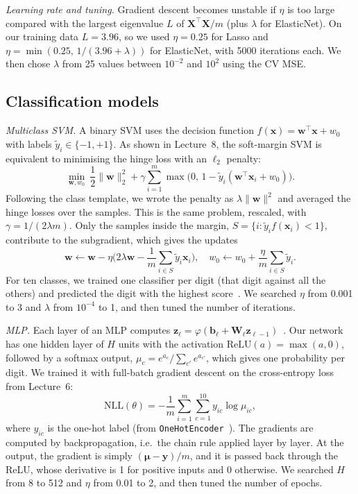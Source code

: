 \documentclass[conference]{IEEEtran}
\newcommand{\vect}[1]{\mathbf{#1}}
\begin{document}
\textit{Learning rate and tuning.} Gradient descent becomes unstable if $\eta$ is too large compared with the largest eigenvalue $L$ of $\vect{X}^\top\vect{X}/m$ (plus $\lambda$ for ElasticNet). On our training data $L=3.96$, so we used $\eta=0.25$ for Lasso and $\eta=\min(0.25,\,1/(3.96+\lambda))$ for ElasticNet, with 5000 iterations each. We then chose $\lambda$ from 25 values between $10^{-2}$ and $10^{2}$ using the CV MSE.

\subsection{Classification models}
\textit{Multiclass SVM.} A binary SVM uses the decision function $f(\vect{x})=\vect{w}^\top\vect{x}+w_0$ with labels $\tilde y_i\in\{-1,+1\}$. As shown in Lecture~8, the soft-margin SVM is equivalent to minimising the hinge loss with an $\ell_2$ penalty:
\begin{equation}
\min_{\vect{w},w_0}\ \frac12\|\vect{w}\|_2^2+\gamma\sum_{i=1}^{m}\max\big(0,\,1-\tilde y_i(\vect{w}^\top\vect{x}_i+w_0)\big).
\label{eq:hinge}
\end{equation}
Following the class template, we wrote the penalty as $\lambda\|\vect{w}\|^2$ and averaged the hinge losses over the samples. This is the same problem, rescaled, with $\gamma=1/(2\lambda m)$. Only the samples inside the margin, $S=\{i:\tilde y_i f(\vect{x}_i)<1\}$, contribute to the subgradient, which gives the updates
\begin{equation}
\vect{w}\leftarrow\vect{w}-\eta\Big(2\lambda\vect{w}-\frac1m\sum_{i\in S}\tilde y_i\vect{x}_i\Big),\quad w_0\leftarrow w_0+\frac{\eta}{m}\sum_{i\in S}\tilde y_i .
\end{equation}
For ten classes, we trained one classifier per digit (that digit against all the others) and predicted the digit with the highest score~\cite{notes}. We searched $\eta$ from 0.001 to 3 and $\lambda$ from $10^{-4}$ to 1, and then tuned the number of iterations.

\textit{MLP.} Each layer of an MLP computes $\vect{z}_\ell=\varphi(\vect{b}_\ell+\vect{W}_\ell\vect{z}_{\ell-1})$~\cite{notes}. Our network has one hidden layer of $H$ units with the activation $\mathrm{ReLU}(a)=\max(a,0)$, followed by a softmax output, $\mu_c=e^{a_c}/\sum_{c'}e^{a_{c'}}$, which gives one probability per digit. We trained it with full-batch gradient descent on the cross-entropy loss from Lecture~6:
\begin{equation}
\mathrm{NLL}(\theta)=-\frac{1}{m}\sum_{i=1}^{m}\sum_{c=1}^{10}y_{ic}\log\mu_{ic},
\label{eq:ce}
\end{equation}
where $y_{ic}$ is the one-hot label (from \texttt{OneHotEncoder}~\cite{skPre}). The gradients are computed by backpropagation, i.e.\ the chain rule applied layer by layer. At the output, the gradient is simply $(\boldsymbol{\mu}-\vect{y})/m$, and it is passed back through the ReLU, whose derivative is 1 for positive inputs and 0 otherwise. We searched $H$ from 8 to 512 and $\eta$ from 0.01 to 2, and then tuned the number of epochs.
\end{document}
